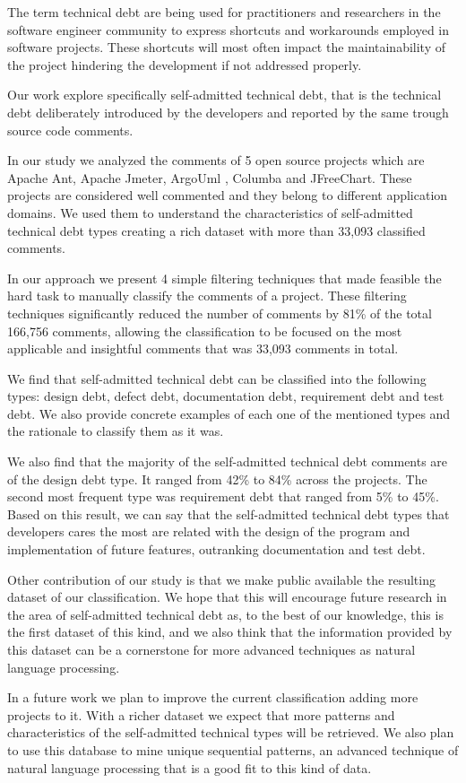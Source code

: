 The term technical debt are being used for practitioners and researchers in the software engineer community to express shortcuts and workarounds employed in software projects. These shortcuts will most often impact the maintainability of the project hindering the development if not addressed properly.

Our work explore specifically self-admitted technical debt, that is the technical debt deliberately introduced by the developers and reported by the same trough source code comments.

In our study we analyzed the comments of 5 open source projects which are Apache Ant, Apache Jmeter, ArgoUml , Columba and JFreeChart. These projects are considered well commented and they belong to different application domains. We used them to understand the characteristics of self-admitted technical debt types creating a rich dataset with more than 33,093 classified comments.

In our approach we present 4 simple filtering techniques that made feasible the hard task to manually classify the comments of a project. These filtering techniques significantly reduced the number of comments by 81\% of the total 166,756 comments, allowing the classification to be focused on the most applicable and insightful comments that was 33,093 comments in total. 

We find that self-admitted technical debt can be classified into the following types: design debt, defect debt, documentation debt, requirement debt and test debt. We also provide concrete examples of each one of the mentioned types and the rationale to classify them as it was.  

We also find that the majority of the self-admitted technical debt comments are of the design debt type. It ranged from 42\% to 84\% across the projects. The second most frequent type was requirement debt that ranged from 5\% to 45\%. Based on this result, we can say that the self-admitted technical debt types that developers cares the most are related with the design of the program and implementation of future features, outranking documentation and test debt.

Other contribution of our study is that we make public available the resulting dataset of our classification. We hope that this will encourage future research in the area of self-admitted technical debt as, to the best of our knowledge, this is the first dataset of this kind, and we also think that the information provided by this dataset can be a cornerstone for more advanced techniques as natural language processing.   

In a future work we plan to improve the current classification adding more projects to it. With a richer dataset we expect that more patterns and characteristics of the self-admitted technical types will be retrieved. We also plan to use this database to mine unique sequential patterns, an advanced technique of natural language processing that is a good fit to this kind of data. 

